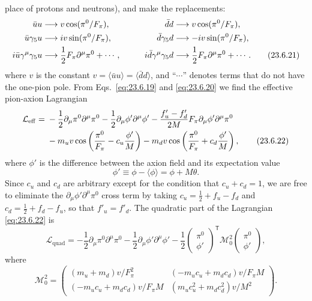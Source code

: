 place of protons and neutrons), and make the replacements:
\begin{alignat}{2}
\bar u u&\longrightarrow v\cos(\pi^0/F_\pi),\qquad&
\bar d d&\longrightarrow v\cos(\pi^0/F_\pi),
\notag\\
\bar u\gamma_5u&\longrightarrow iv\sin(\pi^0/F_\pi),&
\bar d\gamma_5d&\longrightarrow-iv\sin(\pi^0/F_\pi),
\notag\\
i\bar u\gamma^\mu\gamma_5u&\longrightarrow
\frac12F_\pi\partial^\mu\pi^0+\cdots,\qquad&
i\bar d\gamma^\mu\gamma_5d&\longrightarrow
\frac12F_\pi\partial^\mu\pi^0+\cdots.
\tag{23.6.21}\label{eq:23.6.21}
\end{alignat}
where $v$ is the constant $v=\langle\bar u u\rangle=\langle\bar d d\rangle$,
and ``$\cdots$'' denotes terms that do not have the one-pion pole. From
Eqs.~\eqref{eq:23.6.19} and \eqref{eq:23.6.20} we find the effective
pion-axion Lagrangian
\begin{align}
\mathcal L_{\mathrm{eff}}={}&
-\frac12\partial_\mu\pi^0\partial^\mu\pi^0
-\frac12\partial_\mu\phi'\partial^\mu\phi'
-\frac{f'_u-f'_d}{2M}F_\pi
\partial_\mu\phi'\partial^\mu\pi^0
\notag\\
&-m_uv\cos\left(\frac{\pi^0}{F_\pi}-c_u\frac{\phi'}{M}\right)
-m_dv\cos\left(\frac{\pi^0}{F_\pi}+c_d\frac{\phi'}{M}\right),
\tag{23.6.22}\label{eq:23.6.22}
\end{align}
where $\phi'$ is the difference between the axion field and its
expectation value
\begin{equation}
\phi'\equiv\phi-\langle\phi\rangle=\phi+M\theta.
\tag{23.6.23}\label{eq:23.6.23}
\end{equation}
Since $c_u$ and $c_d$ are arbitrary except for the condition that
$c_u+c_d=1$, we are free to eliminate the
$\partial_\mu\phi'\partial^\mu\pi^0$ cross term by taking
$c_u=\frac12+f_u-f_d$ and $c_d=\frac12+f_d-f_u$, so that
$f'_u=f'_d$. The quadratic part of the Lagrangian \eqref{eq:23.6.22} is
\begin{equation}
\mathcal L_{\mathrm{quad}}=
-\frac12\partial_\mu\pi^0\partial^\mu\pi^0
-\frac12\partial_\mu\phi'\partial^\mu\phi'
-\frac12
\begin{pmatrix}\pi^0\\\phi'\end{pmatrix}^{\mathsf T}
\mathcal M_0^2
\begin{pmatrix}\pi^0\\\phi'\end{pmatrix},
\tag{23.6.24}\label{eq:23.6.24}
\end{equation}
where
\begin{equation}
\mathcal M_0^2=
\begin{pmatrix}
(m_u+m_d)v/F_\pi^2&
(-m_uc_u+m_dc_d)v/F_\pi M\\
(-m_uc_u+m_dc_d)v/F_\pi M&
(m_uc_u^2+m_dc_d^2)v/M^2
\end{pmatrix}.
\tag{23.6.25}\label{eq:23.6.25}
\end{equation}
